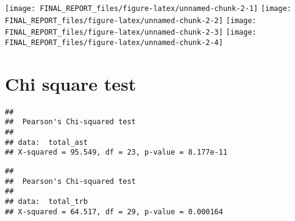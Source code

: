 \documentclass[]{article}
\begin{document}
\begin{center}\texttt{[image: FINAL\_REPORT\_files/figure-latex/unnamed-chunk-2-1]} \texttt{[image: FINAL\_REPORT\_files/figure-latex/unnamed-chunk-2-2]} \texttt{[image: FINAL\_REPORT\_files/figure-latex/unnamed-chunk-2-3]} \texttt{[image: FINAL\_REPORT\_files/figure-latex/unnamed-chunk-2-4]} \end{center}

\section{Chi square test}\label{chi-square-test}

\begin{verbatim}
## 
##  Pearson's Chi-squared test
## 
## data:  total_ast
## X-squared = 95.549, df = 23, p-value = 8.177e-11
\end{verbatim}

\begin{verbatim}
## 
##  Pearson's Chi-squared test
## 
## data:  total_trb
## X-squared = 64.517, df = 29, p-value = 0.000164
\end{verbatim}
\end{document}
